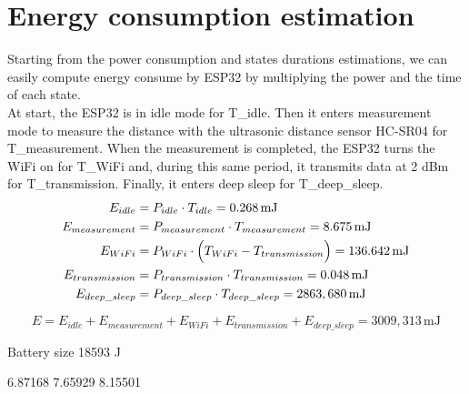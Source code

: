 \section{Energy consumption estimation}
Starting from the power consumption and states durations estimations, we can easily compute energy consume by ESP32 by multiplying the power and the time of each state.\\
At start, the ESP32 is in idle mode for T\_{idle}. Then it enters measurement mode to measure the distance with the ultrasonic distance sensor HC-SR04 for T\_{measurement}. When the measurement is completed, the ESP32 turns the WiFi on for T\_{WiFi} and, during this same period, it transmits data at 2 dBm for T\_{transmission}. Finally, it enters deep sleep for T\_{deep\_sleep}. \\

\begin{align*}
	E_{idle} &= P_{idle} \cdot T_{idle} = 0.268 \,\text{mJ} \\ 
	E_{measurement} &= P_{measurement} \cdot T_{measurement} = 8.675 \,\text{mJ} \\
	E_{WiFi} &= P_{WiFi} \cdot \Bigl(T_{WiFi} - T_{transmission} \Bigr) = 136.642\,\text{mJ} \\
	E_{transmission} &= P_{transmission} \cdot T_{transmission} = 0.048\,\text{mJ} \\
   	E_{deep\_sleep} &= P_{deep\_sleep} \cdot T_{deep\_sleep} = 2863,680\,\text{mJ} 
\end{align*}

\[
E = E_{idle} + E_{measurement} + E_{WiFi} + E_{transmission} + E_{deep\_sleep} = 3009,313\,\text{mJ} 
\]

Battery size
18593 J


6.87168 7.65929 8.15501


